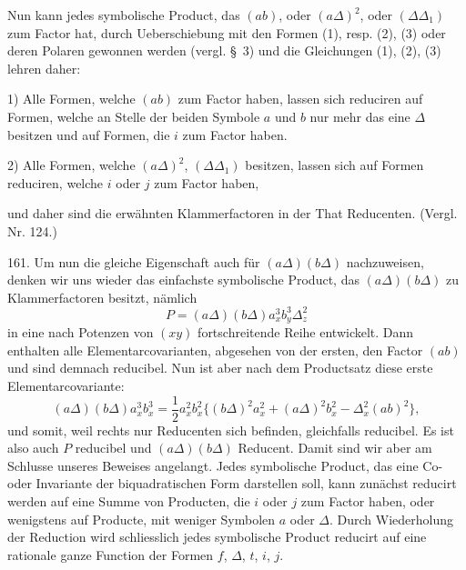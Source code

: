 



Nun kann jedes symbolische Product, das $(ab)$, oder $(a\Delta)^2$, oder $(\Delta\Delta_1)$ zum Factor hat, durch Ueberschiebung mit den Formen (1), resp. (2), (3) oder deren Polaren gewonnen werden (vergl. \S~3) und die Gleichungen (1), (2), (3) lehren daher:

1) Alle Formen, welche $(ab)$ zum Factor haben, lassen sich reduciren auf Formen, welche an Stelle der beiden Symbole $a$ und $b$ nur mehr das eine $\Delta$ besitzen und auf Formen, die $i$ zum Factor haben.

2) Alle Formen, welche $(a\Delta)^2$, $(\Delta\Delta_1)$ besitzen, lassen sich auf Formen reduciren, welche $i$ oder $j$ zum Factor haben,

und daher sind die erwähnten Klammerfactoren in der That Reducenten. (Vergl. Nr. 124.)

161. Um nun die gleiche Eigenschaft auch für $(a\Delta)(b\Delta)$ nachzuweisen, denken wir uns wieder das einfachste symbolische Product, das $(a\Delta)(b\Delta)$ zu Klammerfactoren besitzt, nämlich
\[
P = (a\Delta)(b\Delta)a_x^3 b_y^3 \Delta_z^2
\]
in eine nach Potenzen von $(xy)$ fortschreitende Reihe entwickelt. Dann enthalten alle Elementarcovarianten, abgesehen von der ersten, den Factor $(ab)$ und sind demnach reducibel. Nun ist aber nach dem Productsatz diese erste Elementarcovariante:
\[
(a\Delta)(b\Delta)a_x^3 b_x^3 = \frac{1}{2} a_x^2 b_x^2 \{(b\Delta)^2 a_x^2 + (a\Delta)^2 b_x^2 - \Delta_x^2(ab)^2\},
\]
und somit, weil rechts nur Reducenten sich befinden, gleichfalls reducibel. Es ist also auch $P$ reducibel und $(a\Delta)(b\Delta)$ Reducent. Damit sind wir aber am Schlusse unseres Beweises angelangt. Jedes symbolische Product, das eine Co- oder Invariante der biquadratischen Form darstellen soll, kann zunächst reducirt werden auf eine Summe von Producten, die $i$ oder $j$ zum Factor haben, oder wenigstens auf Producte, mit weniger Symbolen $a$ oder $\Delta$. Durch Wiederholung der Reduction wird schliesslich jedes symbolische Product reducirt auf eine rationale ganze Function der Formen $f$, $\Delta$, $t$, $i$, $j$.

